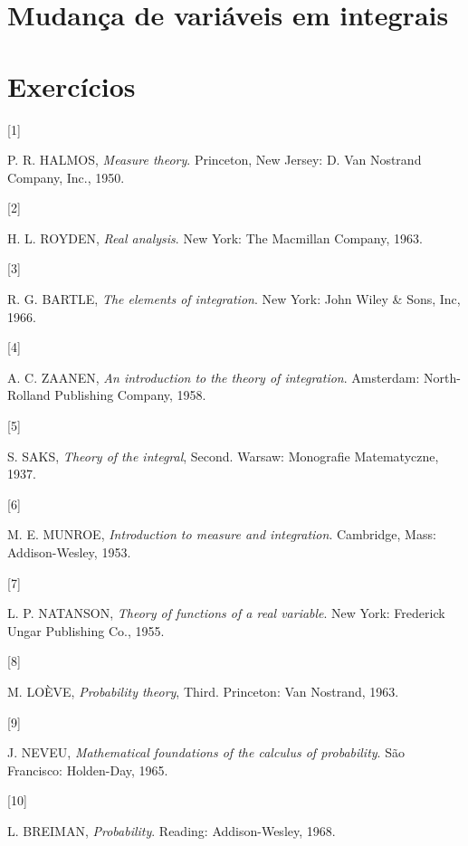 \documentclass[
]{book}
\newlength{\cslhangindent}
\newlength{\csllabelwidth}
\newenvironment{CSLReferences}[2] %
 {\begin{list}{}{%
  \setlength{\itemindent}{0pt}
  \setlength{\leftmargin}{0pt}
  \setlength{\parsep}{0pt}
  \ifodd #1
   \setlength{\leftmargin}{\cslhangindent}
   \setlength{\itemindent}{-1\cslhangindent}
  \fi
  \setlength{\itemsep}{#2\baselineskip}}}
 {\end{list}}
\newcommand{\CSLLeftMargin}[1]{\parbox[t]{\csllabelwidth}{\strut#1\strut}}
\newcommand{\CSLRightInline}[1]{\parbox[t]{\linewidth - \csllabelwidth}{\strut#1\strut}}
\begin{document}
\section{Mudança de variáveis em integrais}\label{mudanuxe7a-de-variuxe1veis-em-integrais}

\section*{Exercícios}\label{exercuxedcios-7}

\label{refs}
\begin{CSLReferences}{0}{0}
\CSLLeftMargin{{[}1{]} }%
\CSLRightInline{P. R. HALMOS, \emph{Measure theory}. Princeton, New Jersey: D. Van Nostrand Company, Inc., 1950.}

\CSLLeftMargin{{[}2{]} }%
\CSLRightInline{H. L. ROYDEN, \emph{Real analysis}. New York: The Macmillan Company, 1963.}

\CSLLeftMargin{{[}3{]} }%
\CSLRightInline{R. G. BARTLE, \emph{The elements of integration}. New York: John Wiley \& Sons, Inc, 1966.}

\CSLLeftMargin{{[}4{]} }%
\CSLRightInline{A. C. ZAANEN, \emph{An introduction to the theory of integration}. Amsterdam: North-Rolland Publishing Company, 1958.}

\CSLLeftMargin{{[}5{]} }%
\CSLRightInline{S. SAKS, \emph{Theory of the integral}, Second. Warsaw: Monografie Matematyczne, 1937.}

\CSLLeftMargin{{[}6{]} }%
\CSLRightInline{M. E. MUNROE, \emph{Introduction to measure and integration}. Cambridge, Mass: Addison-Wesley, 1953.}

\CSLLeftMargin{{[}7{]} }%
\CSLRightInline{L. P. NATANSON, \emph{Theory of functions of a real variable}. New York: Frederick Ungar Publishing Co., 1955.}

\CSLLeftMargin{{[}8{]} }%
\CSLRightInline{M. LOÈVE, \emph{Probability theory}, Third. Princeton: Van Nostrand, 1963.}

\CSLLeftMargin{{[}9{]} }%
\CSLRightInline{J. NEVEU, \emph{Mathematical foundations of the calculus of probability}. São Francisco: Holden-Day, 1965.}

\CSLLeftMargin{{[}10{]} }%
\CSLRightInline{L. BREIMAN, \emph{Probability}. Reading: Addison-Wesley, 1968.}


\end{CSLReferences}
\end{document}

